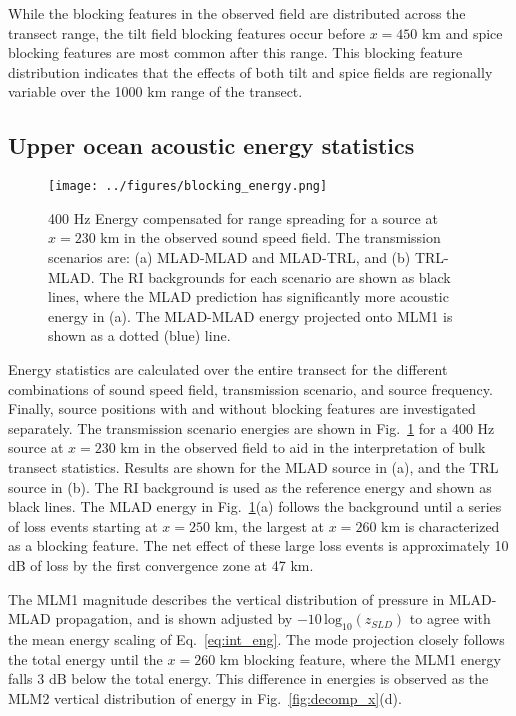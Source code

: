 \documentclass[preprint,NumberedRefs]{JASA}
\begin{document}
While the blocking features in the observed field are distributed across the transect range, the tilt field blocking features occur before $x=450$ km and spice blocking features are most common after this range. This blocking feature distribution indicates that the effects of both tilt and spice fields are regionally variable over the 1000 km range of the transect.

\subsection{Upper ocean acoustic energy statistics}\label{ssec:energy}
\begin{figure}
\texttt{[image: ../figures/blocking\_energy.png]}
    \caption{400 Hz Energy compensated for range spreading for a source at $x=230$ km in the observed sound speed field. The transmission scenarios are: (a) MLAD-MLAD and MLAD-TRL, and (b) TRL-MLAD. The RI backgrounds for each scenario are shown as black lines, where the MLAD prediction has significantly more acoustic energy in (a). The MLAD-MLAD energy projected onto MLM1 is shown as a dotted (blue) line.}
    \label{fig:ml_energy}
\end{figure}
Energy statistics are calculated over the entire transect for the different combinations of sound speed field, transmission scenario, and source frequency. Finally, source positions with and without blocking features are investigated separately. The transmission scenario energies are shown in Fig.~\ref{fig:ml_energy} for a 400 Hz source at $x=230$ km in the observed field to aid in the interpretation of bulk transect statistics. Results are shown for the MLAD source in (a), and the TRL source in (b). The RI background is used as the reference energy and shown as black lines. The MLAD energy in Fig.~\ref{fig:ml_energy}(a) follows the background until a series of loss events starting at $x=250$ km, the largest at $x=260$ km is characterized as a blocking feature. The net effect of these large loss events is approximately 10 dB of loss by the first convergence zone at 47 km.

The MLM1 magnitude describes the vertical distribution of pressure in MLAD-MLAD propagation, and is shown adjusted by $-10 \, \textrm{log}_{10}(z_{SLD})$ to agree with the mean energy scaling of Eq.~\eqref{eq:int_eng}. The mode projection closely follows the total energy until the $x=260$ km blocking feature, where the MLM1 energy falls 3 dB below the total energy. This difference in energies is observed as the MLM2 vertical distribution of energy in Fig.~\ref{fig:decomp_x}(d).
\end{document}
